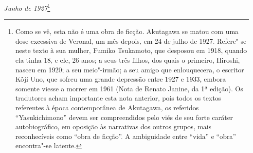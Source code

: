 \begin{flushright}
\textit{Junho de 1927}\footnote{ Como se vê, esta não é uma obra de ficção.
Akutagawa se matou com uma dose excessiva de Veronal, um mês
depois, em 24 de julho de 1927. Refere"-se neste texto à sua mulher,
Fumiko Tsukamoto, que desposou em 1918, quando ela tinha 18, e ele,
26 anos; a seus três filhos, dos quais o primeiro, Hiroshi,
nasceu em 1920; a seu meio"-irmão; a seu amigo que enlouquecera, o escritor
Kôji Uno, que sofreu uma grande depressão entre 1927 e 1933, embora
somente viesse a morrer em 1961 (Nota de Renato Janine, da 1ª edição).
Os tradutores acham importante esta nota anterior, pois todos os textos
referentes à época contemporânea de Akutagawa, os referidos
``Yasukichimono'' devem ser compreendidos pelo viés de seu forte caráter
autobiográfico, em oposição às narrativas dos outros grupos, mais
reconhecíveis como  ``obra de ficção''. A ambiguidade entre ``vida'' e
``obra'' encontra"-se latente.}\\  
\end{flushright}
